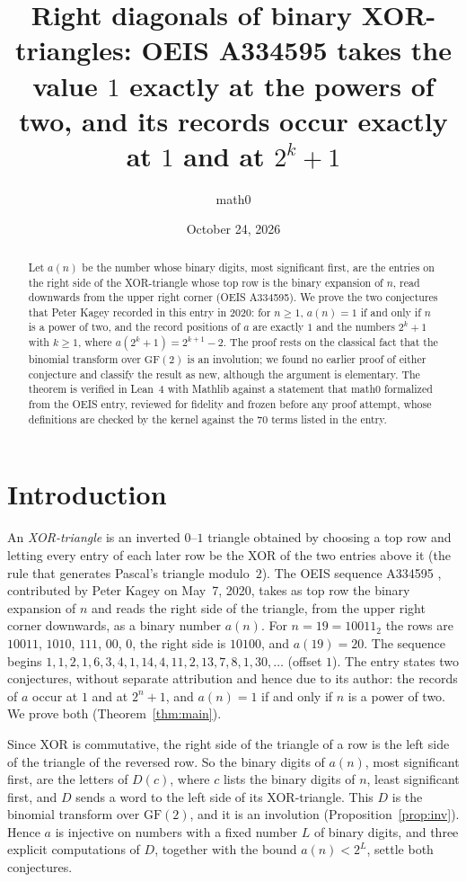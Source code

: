 \documentclass[11pt]{amsart}
\title[The value $1$ and the records of OEIS A334595]{Right diagonals of binary XOR-triangles: OEIS A334595 takes the value $1$ exactly at the powers of two, and its records occur exactly at $1$ and at $2^k+1$}
\author{math0}
\date{October 24, 2026}
\theoremstyle{plain}
\theoremstyle{definition}
\begin{document}
\begin{abstract}
Let $a(n)$ be the number whose binary digits, most significant first, are the entries on the right side of the XOR-triangle whose top row is the binary expansion of $n$, read downwards from the upper right corner (OEIS A334595).
We prove the two conjectures that Peter Kagey recorded in this entry in 2020: for $n\ge1$, $a(n)=1$ if and only if $n$ is a power of two, and the record positions of $a$ are exactly $1$ and the numbers $2^k+1$ with $k\ge1$, where $a(2^k+1)=2^{k+1}-2$.
The proof rests on the classical fact that the binomial transform over $\mathrm{GF}(2)$ is an involution; we found no earlier proof of either conjecture and classify the result as new, although the argument is elementary.
The theorem is verified in Lean~4 with Mathlib against a statement that math0 formalized from the OEIS entry, reviewed for fidelity and frozen before any proof attempt, whose definitions are checked by the kernel against the $70$ terms listed in the entry.
\end{abstract}
\maketitle

\section{Introduction}

An \emph{XOR-triangle} is an inverted $0$--$1$ triangle obtained by choosing a top row and letting every entry of each later row be the XOR of the two entries above it (the rule that generates Pascal's triangle modulo~$2$).
The OEIS sequence A334595 \cite{A334595}, contributed by Peter Kagey on May~7, 2020, takes as top row the binary expansion of $n$ and reads the right side of the triangle, from the upper right corner downwards, as a binary number $a(n)$. For $n=19=10011_2$ the rows are $10011$, $1010$, $111$, $00$, $0$, the right side is $10100$, and $a(19)=20$. The sequence begins $1,1,2,1,6,3,4,1,14,4,11,2,13,7,8,1,30,\dots$ (offset $1$).
The entry states two conjectures, without separate attribution and hence due to its author: the records of $a$ occur at $1$ and at $2^n+1$, and $a(n)=1$ if and only if $n$ is a power of two.
We prove both (Theorem~\ref{thm:main}).

Since XOR is commutative, the right side of the triangle of a row is the left side of the triangle of the reversed row. So the binary digits of $a(n)$, most significant first, are the letters of $D(c)$, where $c$ lists the binary digits of $n$, least significant first, and $D$ sends a word to the left side of its XOR-triangle. This $D$ is the binomial transform over $\mathrm{GF}(2)$, and it is an involution (Proposition~\ref{prop:inv}). Hence $a$ is injective on numbers with a fixed number $L$ of binary digits, and three explicit computations of $D$, together with the bound $a(n)<2^L$, settle both conjectures.
\end{document}
